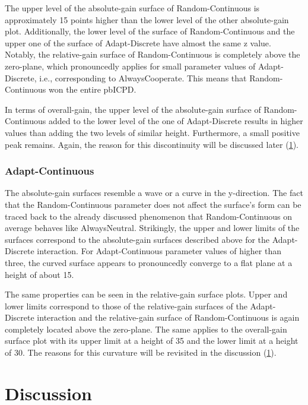 \documentclass[11pt]{article}
\begin{document}
	The upper level of the absolute-gain surface of Random-Continuous is approximately 15 points higher than the lower level of the other absolute-gain plot.
	Additionally, the lower level of the surface of Random-Continuous and the upper one of the surface of Adapt-Discrete have almost the same z value.
	Notably, the relative-gain surface of Random-Continuous is completely above the zero-plane, which pronouncedly applies for small parameter values of Adapt-Discrete, i.e., corresponding to AlwaysCooperate.
	This means that Random-Continuous won the entire pbICPD.

	In terms of overall-gain, the upper level of the absolute-gain surface of Random-Continuous added to the lower level of the one of Adapt-Discrete results in higher values than adding the two levels of similar height.
	Furthermore, a small positive peak remains.
	Again, the reason for this discontinuity will be discussed later (\ref{sec:discussion}).

\subsubsection*{Adapt-Continuous}
	The absolute-gain surfaces resemble a wave or a curve in the y-direction.
	The fact that the Random-Continuous parameter does not affect the surface's form can be traced back to the already discussed phenomenon that Random-Continuous on average behaves like AlwaysNeutral.
	Strikingly, the upper and lower limits of the surfaces correspond to the absolute-gain surfaces described above for the Adapt-Discrete interaction.
	For Adapt-Continuous parameter values of higher than three, the curved surface appears to pronouncedly converge to a flat plane at a height of about 15.

	The same properties can be seen in the relative-gain surface plots.
	Upper and lower limits correspond to those of the relative-gain surfaces of the Adapt-Discrete interaction and the relative-gain surface of Random-Continuous is again completely located above the zero-plane.
	The same applies to the overall-gain surface plot with its upper limit at a height of 35 and the lower limit at a height of 30.
	The reasons for this curvature will be revisited in the discussion (\ref{sec:discussion}).


\section{Discussion} \label{sec:discussion}
\end{document}
